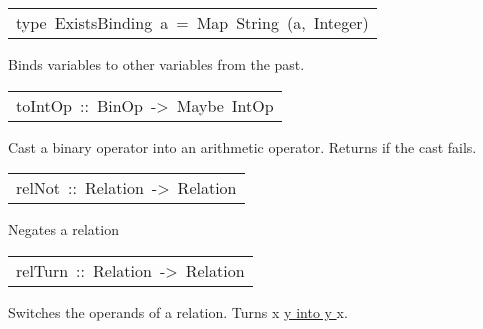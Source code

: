 \begin{haddockdesc}
\item[\begin{tabular}{@{}l}
type\ ExistsBinding\ a\ =\ Map\ String\ (a,\ Integer)
\end{tabular}]\haddockbegindoc
Binds variables to other variables from the past.
\par

\end{haddockdesc}
\begin{haddockdesc}
\item[\begin{tabular}{@{}l}
toIntOp\ ::\ BinOp\ ->\ Maybe\ IntOp
\end{tabular}]\haddockbegindoc
Cast a binary operator into an arithmetic operator. Returns  if the cast fails.
\par

\end{haddockdesc}
\begin{haddockdesc}
\item[\begin{tabular}{@{}l}
relNot\ ::\ Relation\ ->\ Relation
\end{tabular}]\haddockbegindoc
Negates a relation
\par

\end{haddockdesc}
\begin{haddockdesc}
\item[\begin{tabular}{@{}l}
relTurn\ ::\ Relation\ ->\ Relation
\end{tabular}]\haddockbegindoc
Switches the operands of a relation.
   Turns x \url{ y into y } x.
\par

\end{haddockdesc}